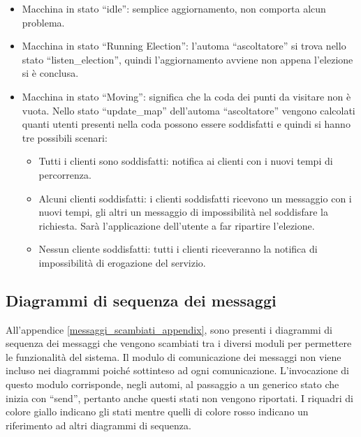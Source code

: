 \begin{itemize}
	\item Macchina in stato ``idle'': semplice aggiornamento, non comporta alcun problema.
	\item Macchina in stato ``Running Election'': l'automa ``ascoltatore'' si trova nello stato ``listen\_election'', quindi l'aggiornamento avviene non appena l'elezione si è conclusa.
	\item Macchina in stato ``Moving'': significa che la coda dei punti da visitare non è vuota. Nello stato ``update\_map'' dell'automa ``ascoltatore'' vengono calcolati quanti utenti presenti nella coda possono essere soddisfatti e quindi si hanno tre possibili scenari:
	\begin{itemize}
		\item Tutti i clienti sono soddisfatti: notifica ai clienti con i nuovi tempi di percorrenza.
		\item Alcuni clienti soddisfatti: i clienti soddisfatti ricevono un messaggio con i nuovi tempi, gli altri un messaggio di impossibilità nel soddisfare la richiesta. Sarà l'applicazione dell'utente a far ripartire l'elezione.
		\item Nessun cliente soddisfatti: tutti i clienti riceveranno la notifica di impossibilità di erogazione del servizio.
	\end{itemize}
\end{itemize}

\subsection{Diagrammi di sequenza dei messaggi}
All'appendice \ref{messaggi_scambiati_appendix}, sono presenti i diagrammi di sequenza dei messaggi che vengono scambiati tra i diversi moduli per permettere le funzionalità del sistema. Il modulo di comunicazione dei messaggi non viene incluso nei diagrammi poiché sottinteso ad ogni comunicazione. L'invocazione di questo modulo corrisponde, negli automi, al passaggio a un generico stato che inizia con ``send'', pertanto anche questi stati non vengono riportati.
I riquadri di colore giallo indicano gli stati mentre quelli di colore rosso indicano un riferimento ad altri diagrammi di sequenza.

